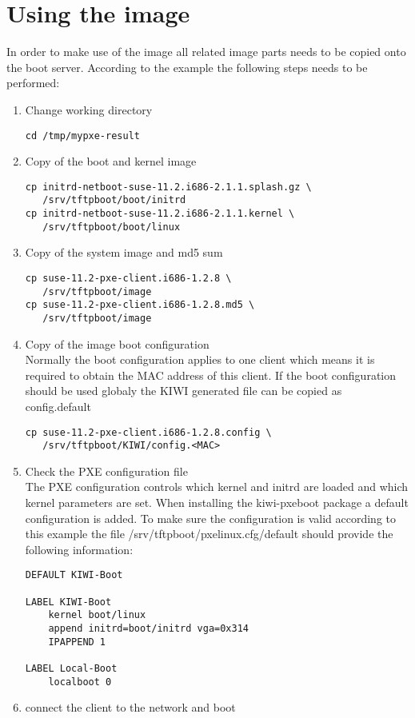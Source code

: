 \section{Using the image}

In order to make use of the image all related image parts needs 
to be copied onto the boot server. According to the example the following
steps needs to be performed:

\begin{enumerate}
\item Change working directory
\begin{verbatim}
cd /tmp/mypxe-result
\end{verbatim}
\item Copy of the boot and kernel image
\begin{verbatim}
cp initrd-netboot-suse-11.2.i686-2.1.1.splash.gz \
   /srv/tftpboot/boot/initrd
cp initrd-netboot-suse-11.2.i686-2.1.1.kernel \
   /srv/tftpboot/boot/linux
\end{verbatim}
\item Copy of the system image and md5 sum
\begin{verbatim}
cp suse-11.2-pxe-client.i686-1.2.8 \
   /srv/tftpboot/image
cp suse-11.2-pxe-client.i686-1.2.8.md5 \
   /srv/tftpboot/image
\end{verbatim}
\item Copy of the image boot configuration\\
      Normally the boot configuration applies to one client which
      means it is required to obtain the MAC address of this client.
      If the boot configuration should be used globaly the KIWI
      generated file can be copied as config.default
\begin{verbatim}
cp suse-11.2-pxe-client.i686-1.2.8.config \
   /srv/tftpboot/KIWI/config.<MAC>
\end{verbatim}
\item Check the PXE configuration file\\
      The PXE configuration controls which kernel and initrd are
      loaded and which kernel parameters are set. When installing
      the kiwi-pxeboot package a default configuration is added.
      To make sure the configuration is valid according to this
      example the file /srv/tftpboot/pxelinux.cfg/default should
      provide the following information:
\begin{verbatim}
DEFAULT KIWI-Boot

LABEL KIWI-Boot
    kernel boot/linux
    append initrd=boot/initrd vga=0x314
    IPAPPEND 1

LABEL Local-Boot
    localboot 0
\end{verbatim}
\item connect the client to the network and boot
\end{enumerate}

